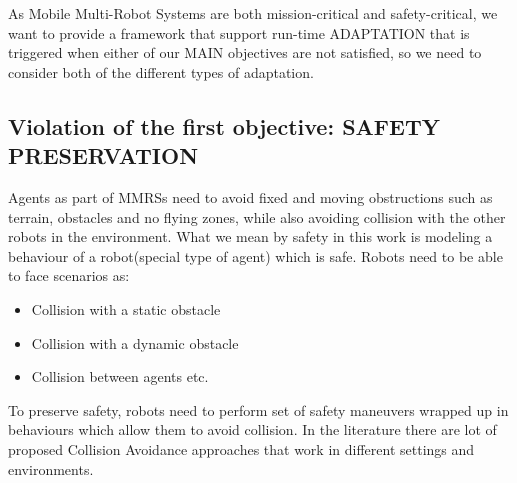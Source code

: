 \documentclass[journal]{IEEEtran}
\theoremstyle{definition}
\begin{document}
As Mobile Multi-Robot Systems are both mission-critical and safety-critical, we want to provide a framework that support run-time ADAPTATION that is triggered when either of our MAIN objectives are not satisfied, so we need to consider both of the different types of adaptation.









\subsection{Violation of the first objective: SAFETY PRESERVATION}

Agents as part of MMRSs need to avoid fixed and moving obstructions such as terrain, obstacles and no flying zones, while also avoiding collision with the other robots in the environment. What we mean by safety in this work is modeling a behaviour of a robot(special type of agent) which is safe. Robots need to be able to face scenarios as:

\begin{itemize}
\item Collision with a static obstacle 
\item Collision with a dynamic obstacle
\item Collision between agents etc.
\end{itemize}
To preserve safety, robots need to perform set of safety maneuvers wrapped up in behaviours which allow them to avoid collision. In the literature there are lot of proposed Collision Avoidance approaches that work in different settings and environments. 
\end{document}
